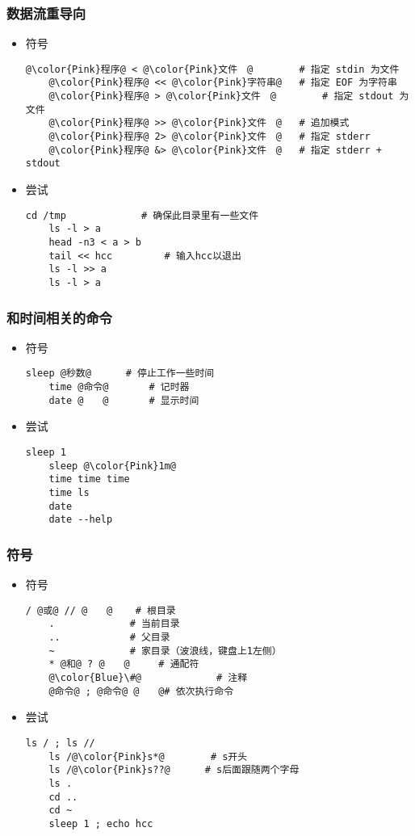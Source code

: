 \begin{CJK}{UTF8}{gbsn}
\begin{frame} [fragile]
	\frametitle{数据流重导向}
	\begin{itemize}
	\item 符号
	\begin{lstlisting}[style=bashstyle, gobble=4, texcl, escapechar=@]
	@\color{Pink}程序@ < @\color{Pink}文件　@		# 指定 stdin 为文件
	@\color{Pink}程序@ << @\color{Pink}字符串@	# 指定 EOF 为字符串
	@\color{Pink}程序@ > @\color{Pink}文件　@		# 指定 stdout 为文件
	@\color{Pink}程序@ >> @\color{Pink}文件　@	# 追加模式
	@\color{Pink}程序@ 2> @\color{Pink}文件　@	# 指定 stderr
	@\color{Pink}程序@ &> @\color{Pink}文件　@	# 指定 stderr + stdout
	\end{lstlisting}
	\item 尝试
	\begin{lstlisting}[style=bashstyle, gobble=4, texcl, escapechar=@]
	cd /tmp				# 确保此目录里有一些文件
	ls -l > a
	head -n3 < a > b
	tail << hcc			# 输入hcc以退出
	ls -l >> a
	ls -l > a
	\end{lstlisting}
	\end{itemize}
\end{frame}

\begin{frame} [fragile]
	\frametitle{和时间相关的命令}
	\linespread{1.25}
	\begin{itemize}
	\item 符号
	\begin{lstlisting}[style=bashstyle, gobble=4, texcl, escapechar=@]
	sleep @秒数@		# 停止工作一些时间
	time @命令@		# 记时器
	date @　　@		# 显示时间
	\end{lstlisting}
	\item 尝试
	\begin{lstlisting}[style=bashstyle, gobble=4, texcl, escapechar=@]
	sleep 1
	sleep @\color{Pink}1m@
	time time time
	time ls
	date
	date --help
	\end{lstlisting}
	\end{itemize}
\end{frame}

\begin{frame} [fragile]
	\frametitle{符号}
	\begin{itemize}
	\item 符号
	\begin{lstlisting}[style=bashstyle, gobble=4, texcl, escapechar=@]
	/ @或@ // @　　@	 # 根目录
	.			  # 当前目录
	..			  # 父目录
	~			  # 家目录（波浪线，键盘上1左侧）
	* @和@ ? @　　@	 # 通配符
	@\color{Blue}\#@			 # 注释
	@命令@ ; @命令@ @　　@# 依次执行命令
	\end{lstlisting}
	\item 尝试
	\begin{lstlisting}[style=bashstyle, gobble=4, texcl, escapechar=@]
	ls / ; ls //
	ls /@\color{Pink}s*@		# s开头
	ls /@\color{Pink}s??@	   # s后面跟随两个字母
	ls .
	cd ..
	cd ~
	sleep 1 ; echo hcc
	\end{lstlisting}
	\end{itemize}
\end{frame}


\end{CJK}
